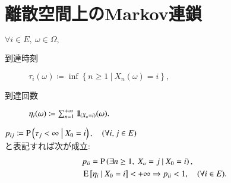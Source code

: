 \section{離散空間上のMarkov連鎖}
	\begin{dfn}[到達時刻と到達回数]
		$\forall i \in E,\ \omega \in \Omega,$
		\begin{description}
			\item[到達時刻] $\tau_i(\omega) \coloneqq \inf{}{\left\{ n \geq 1\ \left|\ X_n(\omega) = i \right.\right\}},$
			\item[到達回数] $\eta_i(\omega) \coloneqq \sum_{n=1}^{+\infty} \mbox{1}\hspace{-0.25em}\mbox{l}_{(X_n = i)}(\omega).$
		\end{description}
	\end{dfn}
	$p_{ij} \coloneqq \operatorname{P} \left( \tau_j < \infty \ \middle|\ X_0 = i \right), \quad (\forall i,j \in E)$\\
	と表記すれば次が成立:
	\begin{align}
		&p_{ii} = \operatorname{P} \left( \exists n \geq 1,\ X_n = j \ \middle|\ X_0 = i \right), \label{eq:mcmc_hit_1} \\
		&\operatorname{E} \left[ \eta_i \ \middle|\ X_0 = i \right] < +\infty \Rightarrow p_{ii} < 1, \quad (\forall i \in E). \label{eq:mcmc_hit_2}
	\end{align}
